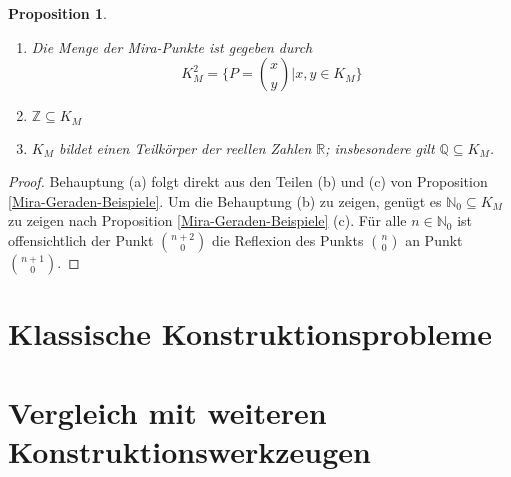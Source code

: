 \documentclass{scrbook}
\newtheorem{proposition}{Proposition}
\newcommand{\vc}[2]{\ensuremath{\binom{#1}{#2}}}
\begin{document}
\begin{proposition}
    \begin{enumerate}[label=(\alph*)]
        \item Die Menge der Mira-Punkte ist gegeben durch
        $$K_M^2 = \{P=\binom{x}{y} \vert x,y \in K_M\}$$
        \item $\mathbb{Z} \subseteq K_M$
        \item $K_M$ bildet einen Teilkörper der reellen Zahlen $\mathbb{R}$; insbesondere gilt $\mathbb{Q} \subseteq K_M$.
    \end{enumerate}
\end{proposition}

\begin{proof}
    Behauptung (a) folgt direkt aus den Teilen (b) und (c) von Proposition \ref{Mira-Geraden-Beispiele}.
    Um die Behauptung (b) zu zeigen, genügt es $\mathbb{N}_0 \subseteq K_M$ zu zeigen nach Proposition \ref{Mira-Geraden-Beispiele} (c).
    Für alle $n \in \mathbb{N}_0$ ist offensichtlich der Punkt \vc{n+2}{0} die Reflexion des Punkts \vc{n}{0} an Punkt \vc{n+1}{0}. 

\end{proof}

\chapter{Klassische Konstruktionsprobleme}

\chapter{Vergleich mit weiteren Konstruktionswerkzeugen}

 
\backmatter


\listoffigures
\end{document}
